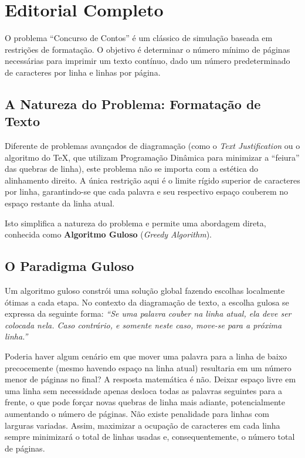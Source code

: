\documentclass[11pt]{article}
\begin{document}
\vspace{1em}


\newpage

\section{Editorial Completo}

O problema ``Concurso de Contos'' é um clássico de simulação baseada em restrições de formatação. O objetivo é determinar o número mínimo de páginas necessárias para imprimir um texto contínuo, dado um número predeterminado de caracteres por linha e linhas por página.

\subsection{A Natureza do Problema: Formatação de Texto}

Diferente de problemas avançados de diagramação (como o \textit{Text Justification} ou o algoritmo do \TeX, que utilizam Programação Dinâmica para minimizar a ``feiura'' das quebras de linha), este problema não se importa com a estética do alinhamento direito. A única restrição aqui é o limite rígido superior de caracteres por linha, garantindo-se que cada palavra e seu respectivo espaço couberem no espaço restante da linha atual.

Isto simplifica a natureza do problema e permite uma abordagem direta, conhecida como \textbf{Algoritmo Guloso} (\textit{Greedy Algorithm}).

\subsection{O Paradigma Guloso}

Um algoritmo guloso constrói uma solução global fazendo escolhas localmente ótimas a cada etapa. No contexto da diagramação de texto, a escolha gulosa se expressa da seguinte forma: 
\textit{``Se uma palavra couber na linha atual, ela deve ser colocada nela. Caso contrário, e somente neste caso, move-se para a próxima linha.''}

\begin{notebox}
Poderia haver algum cenário em que mover uma palavra para a linha de baixo precocemente (mesmo havendo espaço na linha atual) resultaria em um número menor de páginas no final?
A resposta matemática é não. Deixar espaço livre em uma linha sem necessidade apenas desloca todas as palavras seguintes para a frente, o que pode forçar novas quebras de linha mais adiante, potencialmente aumentando o número de páginas. Não existe penalidade para linhas com larguras variadas. Assim, maximizar a ocupação de caracteres em cada linha sempre minimizará o total de linhas usadas e, consequentemente, o número total de páginas.
\end{notebox}
\end{document}
